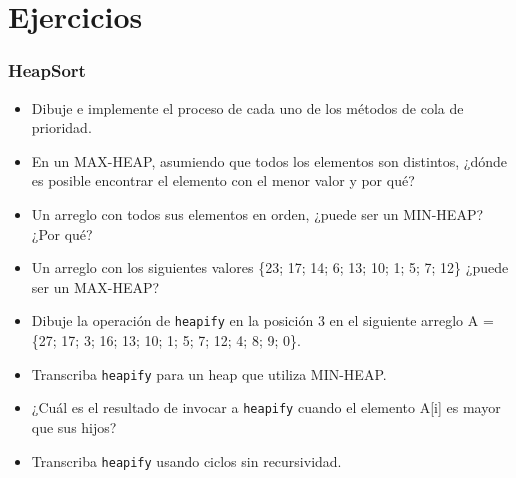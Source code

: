 \documentclass{beamer}
\begin{document}
\section{Ejercicios}
\begin{frame}[fragile]
 \frametitle{HeapSort}
\small
\begin{itemize}
\item Dibuje e implemente el proceso de cada uno de los métodos de cola de prioridad.
\item En un MAX-HEAP, asumiendo que todos los elementos son distintos, ¿dónde es posible encontrar el elemento con el menor valor y por qué?
\item Un arreglo con todos sus elementos en orden, ¿puede ser un MIN-HEAP? ¿Por qué? 
\item Un arreglo con los siguientes valores \{23; 17; 14; 6; 13; 10; 1; 5; 7; 12\} ¿puede ser un MAX-HEAP?
\item Dibuje  la operación de \texttt{heapify} en la posición 3 en el siguiente arreglo A = \{27; 17; 3; 16; 13; 10; 1; 5; 7; 12; 4; 8; 9; 0\}.
\item Transcriba \texttt{heapify} para un heap que utiliza MIN-HEAP.
\item ¿Cuál es el resultado de invocar a \texttt{heapify} cuando el elemento A[i] es mayor que sus hijos?
\item Transcriba \texttt{heapify} usando ciclos sin recursividad.
\end{itemize}
\end{frame}
\end{document}
